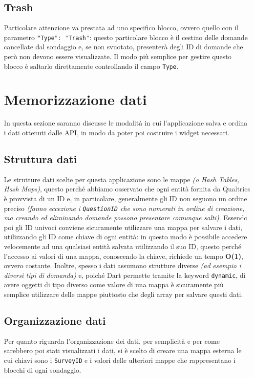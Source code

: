 \subsection{Trash}
Particolare attenzione va prestata ad uno specifico blocco, ovvero quello con il parametro \texttt{"Type": "Trash"}: questo particolare blocco è il cestino delle domande cancellate dal sondaggio e, se non svuotato, presenterà degli ID di domande che però non devono essere visualizzate. Il modo più semplice per gestire questo blocco è saltarlo direttamente controllando il campo \texttt{Type}.

\section{Memorizzazione dati}
In questa sezione saranno discusse le modalità in cui l'applicazione salva e ordina i dati ottenuti dalle API, in modo da poter poi costruire i widget necessari.

\subsection{Struttura dati}
Le strutture dati scelte per questa applicazione sono le mappe \textit{(o Hash Tables, Hash Maps)}, questo perché abbiamo osservato che ogni entità fornita da Qualtrics è provvista di un ID e, in particolare, generalmente gli ID non seguono un ordine preciso \textit{(fanno eccezione i \texttt{QuestionID} che sono numerati in ordine di creazione, ma creando ed eliminando domande possono presentare comunque salti)}. Essendo poi gli ID univoci conviene sicuramente utilizzare una mappa per salvare i dati, utilizzando gli ID come chiave di ogni entità: in questo modo è possibile accedere velocemente ad una qualsiasi entità salvata utilizzando il suo ID, questo perché l'accesso ai valori di una mappa, conoscendo la chiave, richiede un tempo \textbf{O(1)}, ovvero costante\cite{hashmaps}.
Inoltre, spesso i dati assumono strutture diverse \textit{(ad esempio i diversi tipi di domanda)} e, poiché Dart permette tramite la keyword \texttt{dynamic}, di avere oggetti di tipo diverso come valore di una mappa è sicuramente più semplice utilizzare delle mappe piuttosto che degli array per salvare questi dati.

\subsection{Organizzazione dati}
Per quanto riguarda l'organizzazione dei dati, per semplicità e per come sarebbero poi stati visualizzati i dati, si è scelto di creare una mappa esterna le cui chiavi sono i \texttt{SurveyID} e i valori delle ulteriori mappe che rappresentano i blocchi di ogni sondaggio.

